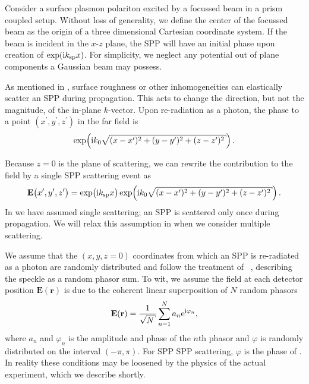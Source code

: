 Consider a surface plasmon polariton excited by a focussed beam in a prism
coupled setup.  Without loss of generality, we define the center of the
focussed beam as the origin of a three dimensional Cartesian coordinate
system.  If the beam is incident in the $x$-$z$ plane, the SPP will have an
initial phase upon creation of $\exp({\mathrm{i}} k_\mathrm{sp} x)$.  For simplicity, we
neglect any potential out of plane components a Gaussian beam may possess. 

As mentioned in , surface roughness or other
inhomogeneities can elastically scatter an SPP during propagation.  This
acts to change the direction, but not the magnitude, of the in-plane
$k$-vector.  Upon re-radiation as a photon, the phase to a point
$(x^\prime,y^\prime,z^\prime)$ in the far field is 
\begin{equation}
\exp\!\left(\mi k_0 \sqrt{ (x-x^\prime)^2 + (y-y^\prime)^2 + (z-z^\prime)^2}\right).
\end{equation}

Because $z=0$ is the plane of scattering, we can rewrite the contribution
to the field by a single SPP scattering event as
\begin{equation}
\mathbf{E}\big(x^\prime,y^\prime,z^\prime\big)=\exp\!\big( \mi \ksp x \big)
\exp\!\left(\mi k_0 \sqrt{ (x-x^\prime)^2 + (y-y^\prime)^2 + (z-z^\prime)^2}\right).
\label{eqn:sppsinglescattering}
\end{equation}
In  we have assumed single scattering; an
SPP is scattered only once during propagation.  We will relax this
assumption in  when we consider multiple
scattering.

We assume that the $(x,y,z=0)$ coordinates from which an SPP is re-radiated
as a photon are randomly distributed and follow the treatment of
~\cite{goodman2007speckle}, describing the speckle as a
random phasor sum.  To wit, we assume the field at each detector position
$\mathbf{E}(\mathbf{r})$ is due to the coherent linear superposition of $N$
random phasors
\begin{equation}
\mathbf{E}(\mathbf{r}) = \frac{1}{\sqrt{N}} \sum_{n=1}^{N} a_n \me^{\mi \varphi_n},
\label{eqn:phasorsum}
\end{equation}
where $a_n$ and $\varphi_n$ is the amplitude and phase of the $n$th phasor 
and $\varphi$ is randomly distributed on the interval $(-\pi,\pi)$.  For SPP
SPP scattering, $\varphi$ is the phase of .
In reality these conditions may be loosened by the physics of the actual
experiment, which we describe shortly.


